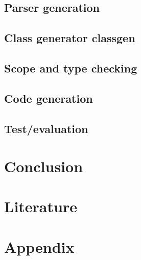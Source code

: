 	\section{Parser generation}
	\section{Class generator classgen}
	\section{Scope and type checking}
	\section{Code generation}
\section{Test/evaluation}

\chapter{Conclusion}



\chapter{Literature}
\begingroup
	\raggedright
	{}	%
\endgroup


\newpage
\listoffixmes	%

\clearforchapter
\chapter{Appendix}
\appendix	%




